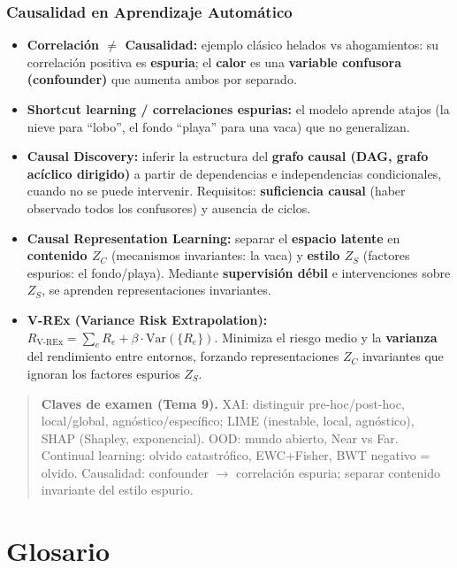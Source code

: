 \documentclass[12pt]{book} %
\providecommand{\tightlist}{%
  \setlength{\itemsep}{0pt}\setlength{\parskip}{0pt}}
\begin{document}
\hypertarget{causalidad-en-aprendizaje-automuxe1tico}{%
\subsection{Causalidad en Aprendizaje
Automático}\label{causalidad-en-aprendizaje-automuxe1tico}}

\begin{itemize}
\tightlist
\item
  \textbf{Correlación \(\neq\) Causalidad:} ejemplo clásico helados vs
  ahogamientos: su correlación positiva es \textbf{espuria}; el
  \textbf{calor} es una \textbf{variable confusora (confounder)} que
  aumenta ambos por separado.
\item
  \textbf{Shortcut learning / correlaciones espurias:} el modelo aprende
  atajos (la nieve para ``lobo'', el fondo ``playa'' para una vaca) que
  no generalizan.
\item
  \textbf{Causal Discovery:} inferir la estructura del \textbf{grafo
  causal (DAG, grafo acíclico dirigido)} a partir de dependencias e
  independencias condicionales, cuando no se puede intervenir.
  Requisitos: \textbf{suficiencia causal} (haber observado todos los
  confusores) y ausencia de ciclos.
\item
  \textbf{Causal Representation Learning:} separar el \textbf{espacio
  latente} en \textbf{contenido \(Z_C\)} (mecanismos invariantes: la
  vaca) y \textbf{estilo \(Z_S\)} (factores espurios: el fondo/playa).
  Mediante \textbf{supervisión débil} e intervenciones sobre \(Z_S\), se
  aprenden representaciones invariantes.
\item
  \textbf{V-REx (Variance Risk Extrapolation):}
  \(R_{\text{V-REx}} = \sum_e R_e + \beta\cdot\text{Var}(\{R_e\})\).
  Minimiza el riesgo medio y la \textbf{varianza} del rendimiento entre
  entornos, forzando representaciones \(Z_C\) invariantes que ignoran
  los factores espurios \(Z_S\).
\end{itemize}

\begin{quote}
\textbf{Claves de examen (Tema 9).} XAI: distinguir pre-hoc/post-hoc,
local/global, agnóstico/específico; LIME (inestable, local, agnóstico),
SHAP (Shapley, exponencial). OOD: mundo abierto, Near vs Far. Continual
learning: olvido catastrófico, EWC+Fisher, BWT negativo = olvido.
Causalidad: confounder \(\to\) correlación espuria; separar contenido
invariante del estilo espurio.
\end{quote}

\hypertarget{glosario}{%
\chapter{Glosario}\label{glosario}}
\end{document}
